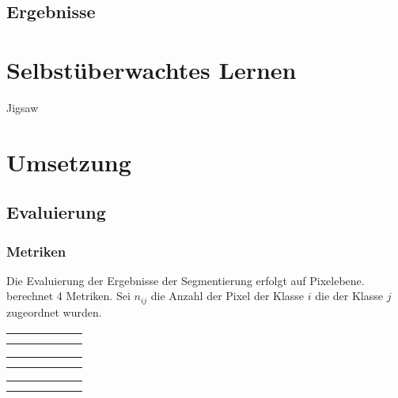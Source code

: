 \section{Ergebnisse}

\chapter{Selbstüberwachtes Lernen}
\label{chap:selfsupervised}

Jigsaw
\cite{NorooziUnsupervisedLearningVisual2016}
\chapter{Umsetzung}

\section{Evaluierung}


\subsection{Metriken}
Die Evaluierung der Ergebnisse der Segmentierung erfolgt auf Pixelebene.
\cite{LongFullyconvolutionalnetworks2015} berechnet 4 Metriken.
Sei \(n_{ij}\) die Anzahl der Pixel der Klasse \(i\) die der Klasse \(j\) zugeordnet wurden.


\newcommand{\resulttable}[3]{
    \begin{tabular}{l|r|r|r|r|r}%
    \hline
        \csvreader[head to column names, filter equal={\dataset}{#2}]{#1}{}%
        {#3}
        \end{tabular}
}
\begin{table*}
    \resulttable{results/document_image_segmentation_results.csv}{CB55}{ \name & \pixelacc & \FgPA & \meanacc & \meanIU & \fwIU\\}
    \resulttable{results/document_image_segmentation_results.csv}{CSG18}{  \pixelacc & \FgPA & \meanacc & \meanIU & \fwIU\\}
    \resulttable{results/document_image_segmentation_results.csv}{CSG863}{  \pixelacc & \FgPA & \meanacc & \meanIU & \fwIU\\}
        
\end{table*}

